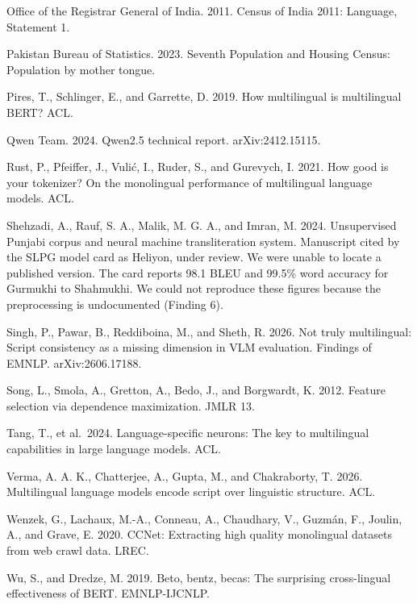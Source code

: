 Office of the Registrar General of India. 2011. Census of India 2011:
Language, Statement 1.

Pakistan Bureau of Statistics. 2023. Seventh Population and Housing
Census: Population by mother tongue.

Pires, T., Schlinger, E., and Garrette, D. 2019. How multilingual is
multilingual BERT? ACL.

Qwen Team. 2024. Qwen2.5 technical report. arXiv:2412.15115.

Rust, P., Pfeiffer, J., Vulić, I., Ruder, S., and Gurevych, I. 2021. How
good is your tokenizer? On the monolingual performance of multilingual
language models. ACL.

Shehzadi, A., Rauf, S. A., Malik, M. G. A., and Imran, M. 2024.
Unsupervised Punjabi corpus and neural machine transliteration system.
Manuscript cited by the SLPG model card as Heliyon, under review. We
were unable to locate a published version. The card reports 98.1 BLEU
and 99.5\% word accuracy for Gurmukhi to Shahmukhi. We could not
reproduce these figures because the preprocessing is undocumented
(Finding 6).

Singh, P., Pawar, B., Reddiboina, M., and Sheth, R. 2026. Not truly
multilingual: Script consistency as a missing dimension in VLM
evaluation. Findings of EMNLP. arXiv:2606.17188.

Song, L., Smola, A., Gretton, A., Bedo, J., and Borgwardt, K. 2012.
Feature selection via dependence maximization. JMLR 13.

Tang, T., et al.~2024. Language-specific neurons: The key to
multilingual capabilities in large language models. ACL.

Verma, A. A. K., Chatterjee, A., Gupta, M., and Chakraborty, T. 2026.
Multilingual language models encode script over linguistic structure.
ACL.

Wenzek, G., Lachaux, M.-A., Conneau, A., Chaudhary, V., Guzmán, F.,
Joulin, A., and Grave, E. 2020. CCNet: Extracting high quality
monolingual datasets from web crawl data. LREC.

Wu, S., and Dredze, M. 2019. Beto, bentz, becas: The surprising
cross-lingual effectiveness of BERT. EMNLP-IJCNLP.
